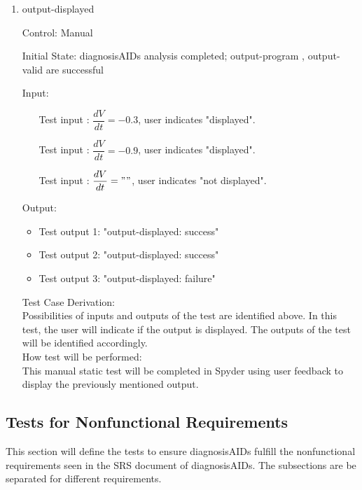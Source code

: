\documentclass[12pt, titlepage]{article}
\newcounter{tinnum} %
\begin{document}
\begin{enumerate}
\begin{enumerate}
\item{output-displayed\\}

Control: Manual
					
Initial State: diagnosisAIDs analysis completed; output-program , output-valid 
are successful
					
Input:
\begin{itemize} %
\item[Test input \refstepcounter{tinnum}\thetinnum\label{Tinput_21}:] 
$\dfrac{dV}{dt} = -0.3$, user indicates "displayed".
\item[Test input \refstepcounter{tinnum}\thetinnum\label{Tinput_22}:] 
$\dfrac{dV}{dt} = -0.9$, user indicates "displayed".
\item[Test input \refstepcounter{tinnum}\thetinnum\label{Tinput_23}:] 
$\dfrac{dV}{dt} = "     "$, user indicates "not displayed".
\end{itemize}

Output: 
\begin{itemize}
\item Test output 1: "output-displayed: success"
\item Test output 2: "output-displayed: success" 
\item Test output 3: "output-displayed: failure"
\end{itemize}

Test Case Derivation:\\
Possibilities of inputs and outputs of the test are identified above. In this 
test, the user will indicate if the output is displayed. The outputs of the test 
will be identified accordingly.\\

How test will be performed: \\
This manual static test will be completed in Spyder using user feedback to 
display the previously mentioned output. \\

\end{enumerate}

\subsection{Tests for Nonfunctional Requirements}
  
This section will define the tests to ensure diagnosisAIDs fulfill the 
nonfunctional requirements seen in the SRS document of diagnosisAIDs. The 
subsections are be separated for different requirements.


\end{enumerate}
\end{document}
